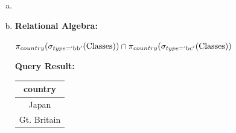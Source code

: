 \documentclass[12pt]{article}
\begin{document}
\begin{enumerate}
\begin{enumerate}[a)]
        \item

        \item

        \textbf{Relational Algebra:}

        \bigskip

        $\pi_{country}(\sigma_{type = `\text{bb}'} (\text{Classes})) \cap \pi_{country}(\sigma_{type = `\text{bc}'}(\text{Classes}))$

        \bigskip

        \textbf{Query Result:}

        \bigskip

        \begin{tabular}{|c|}
            \hline
            country\\
            \hline
            Japan\\
            \hline
            Gt. Britain\\
            \hline
        \end{tabular}

    \end{enumerate}

\end{enumerate}
\end{document}

